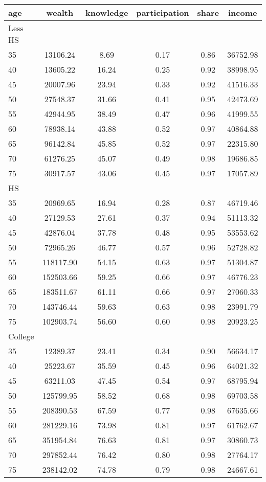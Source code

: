  \begin{tabular}{lccccc}
 \hline \hline
  age & wealth & knowledge & participation & share & income \\
 \hline
 Less HS & & & & & \\
 \hline
35 &  13106.24 &      8.69 &      0.17 &      0.86 &  36752.98 \\ 
40 &  13605.22 &     16.24 &      0.25 &      0.92 &  38998.95 \\ 
45 &  20007.96 &     23.94 &      0.33 &      0.92 &  41516.33 \\ 
50 &  27548.37 &     31.66 &      0.41 &      0.95 &  42473.69 \\ 
55 &  42944.95 &     38.49 &      0.47 &      0.96 &  41999.55 \\ 
60 &  78938.14 &     43.88 &      0.52 &      0.97 &  40864.88 \\ 
65 &  96142.84 &     45.85 &      0.52 &      0.97 &  22315.80 \\ 
70 &  61276.25 &     45.07 &      0.49 &      0.98 &  19686.85 \\ 
75 &  30917.57 &     43.06 &      0.45 &      0.97 &  17057.89 \\ 
 \hline
 HS & & & & & \\
 \hline
35 &  20969.65 &     16.94 &      0.28 &      0.87 &  46719.46 \\ 
40 &  27129.53 &     27.61 &      0.37 &      0.94 &  51113.32 \\ 
45 &  42876.04 &     37.78 &      0.48 &      0.95 &  53553.62 \\ 
50 &  72965.26 &     46.77 &      0.57 &      0.96 &  52728.82 \\ 
55 & 118117.90 &     54.15 &      0.63 &      0.97 &  51304.87 \\ 
60 & 152503.66 &     59.25 &      0.66 &      0.97 &  46776.23 \\ 
65 & 183511.67 &     61.11 &      0.66 &      0.97 &  27060.33 \\ 
70 & 143746.44 &     59.63 &      0.63 &      0.98 &  23991.79 \\ 
75 & 102903.74 &     56.60 &      0.60 &      0.98 &  20923.25 \\ 
 \hline
 College & & & & & \\
 \hline
35 &  12389.37 &     23.41 &      0.34 &      0.90 &  56634.17 \\ 
40 &  25223.67 &     35.59 &      0.45 &      0.96 &  64021.32 \\ 
45 &  63211.03 &     47.45 &      0.54 &      0.97 &  68795.94 \\ 
50 & 125799.95 &     58.52 &      0.68 &      0.98 &  69703.58 \\ 
55 & 208390.53 &     67.59 &      0.77 &      0.98 &  67635.66 \\ 
60 & 281229.16 &     73.98 &      0.81 &      0.97 &  61762.67 \\ 
65 & 351954.84 &     76.63 &      0.81 &      0.97 &  30860.73 \\ 
70 & 297852.44 &     76.42 &      0.80 &      0.98 &  27764.17 \\ 
75 & 238142.02 &     74.78 &      0.79 &      0.98 &  24667.61 \\ 
 \hline \hline
 \end{tabular}

